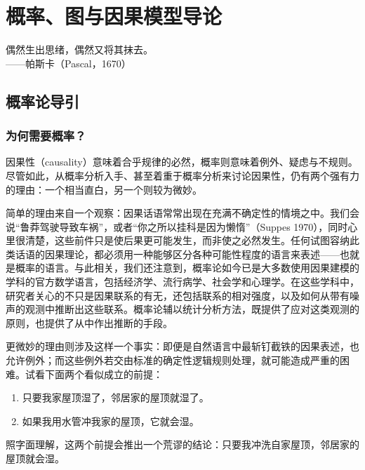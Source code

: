 \chapter{概率、图与因果模型导论}

\begin{flushright}
\kaishu\small
偶然生出思绪，偶然又将其抹去。\\[2pt]
——帕斯卡（Pascal，1670）
\end{flushright}

\section{概率论导引}

\subsection{为何需要概率？}

因果性（causality）意味着合乎规律的必然，概率则意味着例外、疑虑与不规则。尽管如此，从概率分析入手、甚至着重于概率分析来讨论因果性，仍有两个强有力的理由：一个相当直白，另一个则较为微妙。

简单的理由来自一个观察：因果话语常常出现在充满不确定性的情境之中。我们会说“鲁莽驾驶导致车祸”，或者“你之所以挂科是因为懒惰”（Suppes 1970），同时心里很清楚，这些前件只是使后果更可能发生，而非使之必然发生。任何试图容纳此类话语的因果理论，都必须用一种能够区分各种可能性程度的语言来表述——也就是概率的语言。与此相关，我们还注意到，概率论如今已是大多数使用因果建模的学科的官方数学语言，包括经济学、流行病学、社会学和心理学。在这些学科中，研究者关心的不只是因果联系的有无，还包括联系的相对强度，以及如何从带有噪声的观测中推断出这些联系。概率论辅以统计分析方法，既提供了应对这类观测的原则，也提供了从中作出推断的手段。

更微妙的理由则涉及这样一个事实：即便是自然语言中最斩钉截铁的因果表述，也允许例外；而这些例外若交由标准的确定性逻辑规则处理，就可能造成严重的困难。试看下面两个看似成立的前提：

\begin{enumerate}[label=\arabic*.]
\item 只要我家屋顶湿了，邻居家的屋顶就湿了。
\item 如果我用水管冲我家的屋顶，它就会湿。
\end{enumerate}

照字面理解，这两个前提会推出一个荒谬的结论：只要我冲洗自家屋顶，邻居家的屋顶就会湿。

